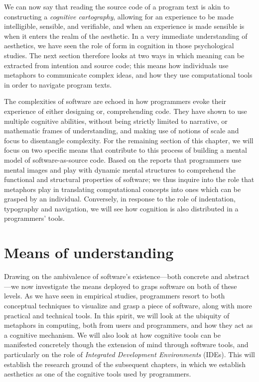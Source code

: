 We can now say that reading the source code of a program text is akin to constructing a \emph{cognitive cartography}, allowing for an experience to be made intelligible, sensible, and verifiable, and when an experience is made sensible is when it enters the realm of the aesthetic. In a very immediate understanding of aesthetics, we have seen the role of form in cognition in those psychological studies. The next section therefore looks at two ways in which meaning can be extracted from intention and source code; this means how individuals use metaphors to communicate complex ideas, and how they use computational tools in order to navigate program texts.

The complexities of software are echoed in how programmers evoke their experience of either designing or, comprehending code. They have shown to use multiple cognitive abilities, without being strictly limited to narrative, or mathematic frames of understanding, and making use of notions of scale and focus to disentangle complexity. For the remaining section of this chapter, we will focus on two specific means that contribute to this process of building a mental model of software-as-source code. Based on the reports that programmers use mental images and play with dynamic mental structures to comprehend the functional and structural properties of software; we thus inquire into the role that metaphors play in translating computational concepts into ones which can be grasped by an individual. Conversely, in response to the role of indentation, typography and navigation, we will see how cognition is also distributed in a programmers' tools.

\spacer

\section{Means of understanding}
\label{sec:means-understanding}

Drawing on the ambivalence of software's existence—both concrete and abstract—we now investigate the means deployed to graps software on both of these levels. As we have seen in empirical studies, programmers resort to both conceptual techniques to visualize and grasp a piece of software, along with more practical and technical tools. In this spirit, we will look at the ubiquity of metaphors in computing,  both from users and programmers, and how they act as a cognitive mechanism. We will also look at how cognitive tools can be manifested concretely though the extension of mind through software tools, and particularly on the role of \emph{Integrated Development Environments} (IDEs). This will establish the research ground of the subsequent chapters, in which we establish aesthetics as one of the cognitive tools used by programmers.

